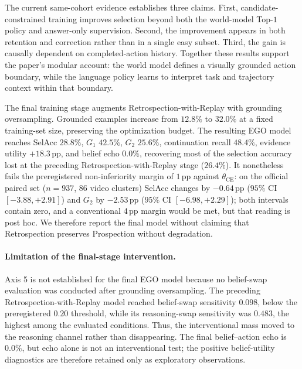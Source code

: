\documentclass[letterpaper]{article}
\newcommand{\obs}[1]{\textcolor{measuredblue}{#1}}
\newcommand{\pp}{\,\mathrm{pp}}
\newcommand{\method}{\textsc{EGO}}
\begin{document}
The current same-cohort evidence establishes three claims.  First,
candidate-constrained training improves selection beyond both the
world-model Top-\obs{$1$} policy and answer-only supervision.  Second, the
improvement appears in both retention and correction rather than in a single
easy subset.  Third, the gain is causally dependent on completed-action
history.  Together these results support the paper's modular account:
the world model defines a visually grounded action boundary, while the
language policy learns to interpret task and trajectory context within that
boundary.

The final training stage augments Retrospection-with-Replay with grounding
oversampling.  Grounded examples increase from \obs{$12.8\%$} to
\obs{$32.0\%$} at a fixed training-set size, preserving the optimization
budget.  The resulting \method{} model reaches SelAcc \obs{$28.8\%$}, $G_1$
\obs{$42.5\%$}, $G_2$ \obs{$25.6\%$}, continuation recall \obs{$48.4\%$},
evidence utility \obs{$+18.3\pp$}, and belief echo \obs{$0.0\%$}, recovering
most of the selection accuracy lost at the preceding Retrospection-with-Replay
stage (\obs{$26.4\%$}).  It nonetheless fails the preregistered non-inferiority
margin of \obs{$1\pp$} against $\theta_{\mathrm{CE}}$: on the official
paired set (\obs{$n{=}937$}, 86 video clusters) SelAcc changes by
\obs{$-0.64\pp$} (\obs{$95\%$ CI $[-3.88,+2.91]$}) and $G_2$ by
\obs{$-2.53\pp$} (\obs{$95\%$ CI $[-6.98,+2.29]$}); both intervals contain
zero, and a conventional \obs{$4\pp$} margin would be met, but that reading
is post hoc.  We therefore report the final model without claiming that
Retrospection preserves Prospection without degradation.

{\color{pendingred}
\paragraph{Limitation of the final-stage intervention.}
Axis 5 is not established for the final \method{} model because no
belief-swap evaluation was conducted after grounding oversampling.  The
preceding Retrospection-with-Replay model reached belief-swap sensitivity
$0.098$, below the preregistered $0.20$ threshold, while its
reasoning-swap sensitivity was $0.483$, the highest among the evaluated
conditions.  Thus, the interventional mass moved to the reasoning channel
rather than disappearing.  The final belief--action echo is $0.0\%$,
but echo alone is not an interventional test; the positive belief-utility
diagnostics are therefore retained only as exploratory observations.
\par}
\end{document}
